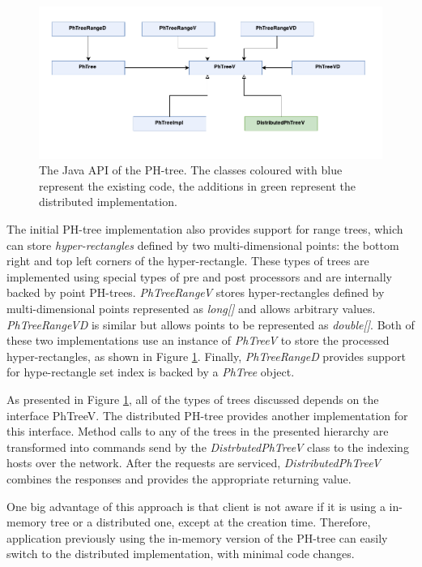 \documentclass[11pt,a4paper]{globis-book}
\begin{document}
\begin{figure}[h]
    \centering 
    \includegraphics[scale=1]{images/PH-Tree-API}
    \caption{The Java API of the PH-tree. The classes coloured with blue represent the existing code, the additions in green represent the distributed implementation.}
    \label{fig:PH-tree-Java-API}
\end{figure}

The initial PH-tree implementation also provides support for range trees, which can store \textit{hyper-rectangles} defined by two multi-dimensional points: the bottom right and top left corners of the hyper-rectangle. These types of trees are implemented using special types of pre and post processors and are internally backed by point PH-trees. \textit{PhTreeRangeV} stores hyper-rectangles defined by multi-dimensional points represented as \textit{long[]} and allows arbitrary values. \textit{PhTreeRangeVD} is similar but allows points to be represented as \textit{double[]}. Both of these two implementations use an instance of \textit{PhTreeV} to store the processed hyper-rectangles, as shown in Figure \ref{fig:PH-tree-Java-API}. Finally, \textit{PhTreeRangeD} provides support for hype-rectangle set index is backed by a \textit{PhTree} object. 

As presented in Figure \ref{fig:PH-tree-Java-API}, all of the types of trees discussed depends on the interface PhTreeV. The distributed PH-tree provides another implementation for this interface. Method calls to any of the trees in the presented hierarchy are transformed into commands send by the \textit{DistrbutedPhTreeV} class to the indexing hosts over the network. After the requests are serviced, \textit{DistributedPhTreeV} combines the responses and provides the appropriate returning value. 

One big advantage of this approach is that client is not aware if it is using a in-memory tree or a distributed one, except at the creation time. Therefore, application previously using the in-memory version of the PH-tree can easily switch to the distributed implementation, with minimal code changes. 
\end{document}
